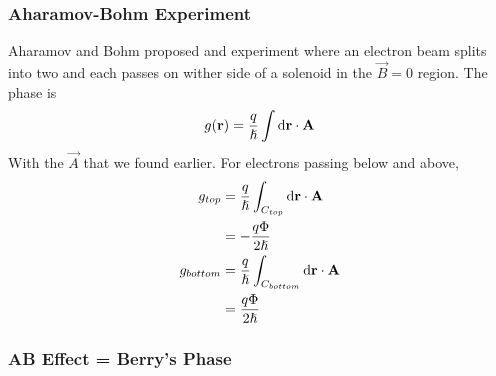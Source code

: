 \documentclass[a4paper]{article}
\begin{document}
\subsubsection{Aharamov-Bohm Experiment}
Aharamov and Bohm proposed and experiment where an electron beam splits into
two and each passes on wither side of a solenoid in the $\vec{B}=0$ region. The
phase is
\[
	g(\boldsymbol{\mathbf{r}}) = \frac{q}{\hslash}\int\mathrm{d}\boldsymbol{\mathbf{r}}\cdot\boldsymbol{\mathbf{A}}
\]
With the $\vec{A}$ that we found earlier. For electrons passing below and
above,
\begin{align*}
	g_{top} &= \frac{q}{\hslash}\int_{C_{top}}\mathrm{d}\boldsymbol{\mathbf{r}}\cdot\boldsymbol{\mathbf{A}}\\
	&= -\frac{q\Phi}{2\hslash}\\
	g_{bottom} &= \frac{q}{\hslash}\int_{C_{bottom}}\mathrm{d}\boldsymbol{\mathbf{r}}\cdot\boldsymbol{\mathbf{A}}\\
	&= \frac{q\Phi}{2\hslash}
\end{align*}


\subsubsection{AB Effect = Berry's Phase}
\end{document}

